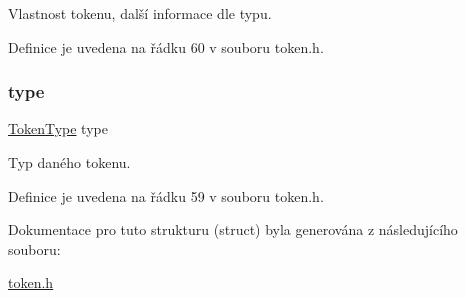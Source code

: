 Vlastnost tokenu, další informace dle typu. 



Definice je uvedena na řádku 60 v souboru token.\+h.

\mbox{\label{struct_s___token_a6e2d2148929ac137f2e2ef4091a4dc69}} 
\subsubsection{\texorpdfstring{type}{type}}
{\footnotesize\ttfamily \hyperlink{token_8h_af940495a1407c2a014c0aed83c75ff20}{Token\+Type} type}



Typ daného tokenu. 



Definice je uvedena na řádku 59 v souboru token.\+h.



Dokumentace pro tuto strukturu (struct) byla generována z následujícího souboru\+:\begin{DoxyCompactItemize}
\item 
\hyperlink{token_8h}{token.\+h}\end{DoxyCompactItemize}
